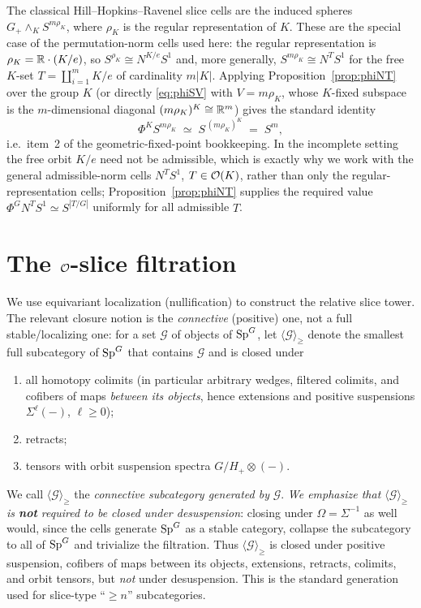 \begin{qfiveremark}\label{rem:rho-cells}
The classical Hill--Hopkins--Ravenel slice cells are the induced spheres
$G_+\wedge_K S^{m\rho_K}$, where $\rho_K$ is the regular representation of $K$.
These are the special case of the permutation-norm cells used here: the regular
representation is $\rho_K=\mathbb{R}\cdot(K/e)$, so $S^{\rho_K}\cong N^{K/e}S^1$ and,
more generally, $S^{m\rho_K}\cong N^{T}S^1$ for the free $K$-set $T=\coprod_{i=1}^m K/e$
of cardinality $m|K|$. Applying Proposition~\ref{prop:phiNT} over the group $K$
(or directly \eqref{eq:phiSV} with $V=m\rho_K$, whose $K$-fixed subspace is the
$m$-dimensional diagonal $(m\rho_K)^K\cong\mathbb{R}^m$) gives the standard identity
\[
\Phi^K S^{m\rho_K}\;\simeq\;S^{\,(m\rho_K)^K}\;=\;S^{m},
\]
i.e.\ item~2 of the geometric-fixed-point bookkeeping. In the incomplete setting
the free orbit $K/e$ need not be admissible, which is exactly why we work with
the general admissible-norm cells $N^TS^1$, $T\in\mathcal{O}(K)$, rather than only
the regular-representation cells; Proposition~\ref{prop:phiNT} supplies the
required value $\Phi^GN^TS^1\simeq S^{|T/G|}$ uniformly for all admissible $T$.
\end{qfiveremark}


\section*{The $\mathcal{O}$-slice filtration}

We use equivariant localization (nullification) to construct the relative slice
tower. The relevant closure notion is the \emph{connective} (positive) one, not
a full stable/localizing one: for a set $\mathcal G$ of objects of $\mathrm{Sp}^G$, let
$\langle\mathcal G\rangle_{\ge}$ denote the smallest full subcategory of
$\mathrm{Sp}^G$ that contains $\mathcal G$ and is closed under
\begin{enumerate}\setlength\itemsep{1pt}
\item[(o1)] all homotopy colimits (in particular arbitrary wedges, filtered
colimits, and cofibers of maps \emph{between its objects}, hence extensions and
positive suspensions $\Sigma^{\ell}(-)$, $\ell\ge0$);
\item[(o2)] retracts;
\item[(o3)] tensors with orbit suspension spectra $G/H_+\otimes(-)$.
\end{enumerate}
We call $\langle\mathcal G\rangle_{\ge}$ the \emph{connective subcategory
generated by} $\mathcal G$. \emph{We emphasize that $\langle\mathcal
G\rangle_{\ge}$ is \textbf{not} required to be closed under desuspension}: closing
under $\Omega=\Sigma^{-1}$ as well would, since the cells generate $\mathrm{Sp}^G$ as a
stable category, collapse the subcategory to all of $\mathrm{Sp}^G$ and trivialize the
filtration. Thus $\langle\mathcal G\rangle_{\ge}$ is closed under positive
suspension, cofibers of maps between its objects, extensions, retracts, colimits,
and orbit tensors, but \emph{not} under desuspension. This is the standard
generation used for slice-type ``$\ge n$'' subcategories.

